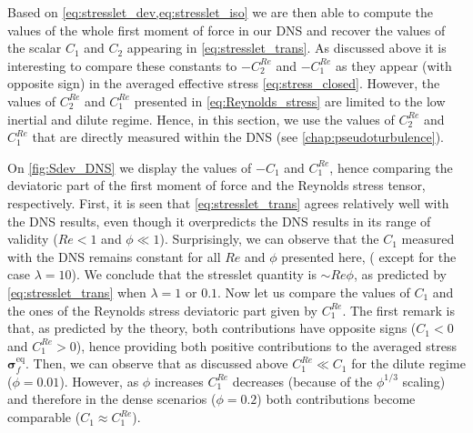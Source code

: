 Based on \ref{eq:stresslet_dev,eq:stresslet_iso} we are then able to compute the values of the whole first moment of force in our DNS and recover the values of the scalar $C_1$ and $C_2$ appearing in \ref{eq:stresslet_trans}. 
As discussed above it is interesting to compare these constants to $- C_2^{Re}$ and $-C_1^{Re}$ as they appear (with opposite sign) in the averaged effective stress \eqref{eq:stress_closed}. 
However, the values of $C_2^{Re}$ and $C_1^{Re}$ presented in \ref{eq:Reynolds_stress} are limited to the low inertial and dilute regime. 
Hence, in this section, we use the values of $C_2^{Re}$ and $C_1^{Re}$ that are directly measured within the DNS (see \ref{chap:pseudoturbulence}). 

On \ref{fig:Sdev_DNS} we display the values of $-C_1$ and $C_1^{Re}$, hence comparing the deviatoric part of the first moment of force and the Reynolds stress tensor, respectively. 
First, it is seen that \ref{eq:stresslet_trans} agrees relatively well with the DNS results, even though it overpredicts the DNS results in its range of validity ($Re < 1$ and $\phi \ll 1$). 
Surprisingly, we can observe that the $C_1$ measured with the DNS remains constant for all $Re$ and $\phi$ presented here, ( except for the case $\lambda = 10$).
We conclude that the stresslet quantity is $\sim Re\phi$, as predicted by \ref{eq:stresslet_trans} when $\lambda = 1$ or $0.1$. 
Now let us compare the values of $C_1$ and the ones of the Reynolds stress deviatoric part given by $C_1^{Re}$. 
The first remark is that, as predicted by the theory, both contributions have opposite signs ($C_1 <0$ and $C_1^{Re} > 0$), hence providing both positive contributions to the averaged stress $\bm\sigma_f^\text{eq}$. 
Then, we can observe that as discussed above $C_1^{Re} \ll C_1$ for the dilute regime ($\phi =0.01$). 
However, as $\phi$ increases $C_1^{Re}$ decreases (because of the $\phi^{1/3}$ scaling) and therefore in the dense scenarios ($\phi =0.2$) both contributions become comparable ($C_1 \approx C_1^{Re}$). 
